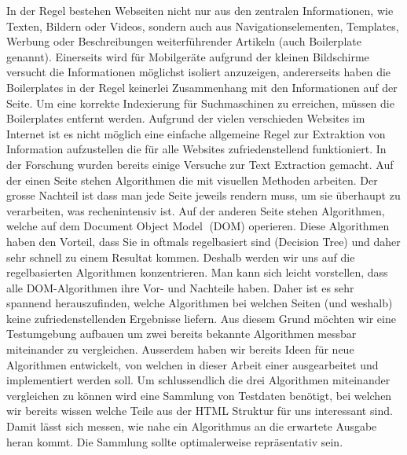 In der Regel bestehen Webseiten nicht nur aus den zentralen Informationen, wie Texten, Bildern oder Videos, sondern auch aus Navigationselementen, Templates, Werbung oder Beschreibungen weiterführender Artikeln (auch Boilerplate genannt). Einerseits wird für Mobilgeräte aufgrund der kleinen Bildschirme versucht die Informationen möglichst isoliert anzuzeigen, andererseits haben die Boilerplates in der Regel keinerlei Zusammenhang mit den Informationen auf der Seite. Um eine korrekte Indexierung für Suchmaschinen zu erreichen, müssen die Boilerplates entfernt werden. Aufgrund der vielen verschieden Websites im Internet ist es nicht möglich eine einfache allgemeine Regel zur Extraktion von Information aufzustellen die für alle Websites zufriedenstellend funktioniert. 
In der Forschung wurden bereits einige Versuche zur Text Extraction gemacht. Auf der einen Seite stehen Algorithmen die mit visuellen Methoden arbeiten. Der grosse Nachteil ist dass man jede Seite jeweils rendern muss, um sie überhaupt zu verarbeiten, was rechenintensiv ist. Auf der anderen Seite stehen Algorithmen, welche auf dem Document Object Model 
(DOM) operieren. Diese Algorithmen haben den Vorteil, dass Sie in oftmals regelbasiert sind (Decision Tree) und daher sehr schnell zu einem Resultat kommen. Deshalb werden wir uns auf die regelbasierten Algorithmen konzentrieren.
Man kann sich leicht vorstellen, dass alle DOM-Algorithmen ihre Vor- und Nachteile haben. Daher ist es sehr spannend herauszufinden, welche Algorithmen bei welchen Seiten (und weshalb) keine zufriedenstellenden Ergebnisse liefern. Aus diesem Grund möchten wir eine Testumgebung aufbauen um zwei bereits bekannte Algorithmen messbar miteinander zu vergleichen. Ausserdem haben wir bereits Ideen für neue Algorithmen entwickelt, von welchen in dieser Arbeit einer ausgearbeitet und implementiert werden soll.
Um schlussendlich die drei Algorithmen miteinander vergleichen zu können wird eine Sammlung von Testdaten benötigt, bei welchen wir bereits wissen welche Teile aus der HTML Struktur für uns interessant sind. Damit lässt sich messen, wie nahe ein Algorithmus an die erwartete Ausgabe heran kommt. Die Sammlung sollte optimalerweise repräsentativ sein. 

